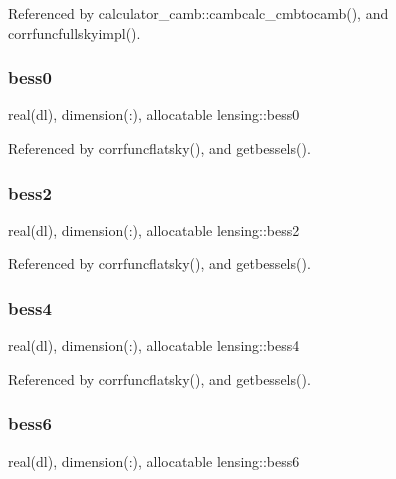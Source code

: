 Referenced by calculator\+\_\+camb\+::cambcalc\+\_\+cmbtocamb(), and corrfuncfullskyimpl().

\mbox{\label{namespacelensing_aedcd5bd61cd6f457b30a9197a6a8c49c}} 
\subsubsection{\texorpdfstring{bess0}{bess0}}
{\footnotesize\ttfamily real(dl), dimension(\+:), allocatable lensing\+::bess0\hspace{0.3cm}{\ttfamily [private]}}



Referenced by corrfuncflatsky(), and getbessels().

\mbox{\label{namespacelensing_a2d7ff26f68bd68d466d651f07fd262fd}} 
\subsubsection{\texorpdfstring{bess2}{bess2}}
{\footnotesize\ttfamily real(dl), dimension(\+:), allocatable lensing\+::bess2\hspace{0.3cm}{\ttfamily [private]}}



Referenced by corrfuncflatsky(), and getbessels().

\mbox{\label{namespacelensing_a835b869aac1268a3e5f6dea95667740b}} 
\subsubsection{\texorpdfstring{bess4}{bess4}}
{\footnotesize\ttfamily real(dl), dimension(\+:), allocatable lensing\+::bess4\hspace{0.3cm}{\ttfamily [private]}}



Referenced by corrfuncflatsky(), and getbessels().

\mbox{\label{namespacelensing_aba411bd5dd31565120f85d0a89b71ba5}} 
\subsubsection{\texorpdfstring{bess6}{bess6}}
{\footnotesize\ttfamily real(dl), dimension(\+:), allocatable lensing\+::bess6\hspace{0.3cm}{\ttfamily [private]}}



